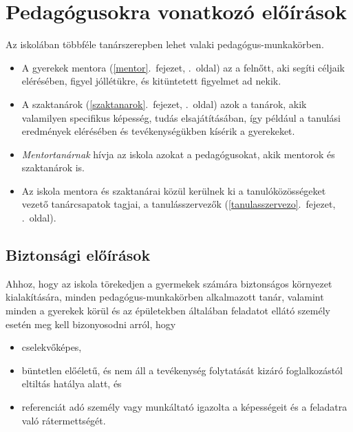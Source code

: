\hypertarget{pedagogusokra-vonatkozo-eloirasok}{%
\section{Pedagógusokra vonatkozó
előírások}\label{pedagogusokra-vonatkozo-eloirasok}}

Az iskolában többféle tanárszerepben lehet valaki pedagógus-mun\-ka\-kör\-ben.

\begin{itemize}
\item
  A gyerekek mentora (\ref{mentor}.~fejezet, \pageref{mentor}.~oldal)
  az a felnőtt, aki segíti céljaik elérésében, figyel jóllétükre, és
  kitüntetett figyelmet ad nekik.
\item
  A
  szaktanárok (\ref{szaktanarok}.~fejezet, \pageref{szaktanarok}.~oldal)
  azok a tanárok, akik valamilyen specifikus képesség, tudás elsajátításában, így például a tanulási
  eredmények elérésében
  és tevékenységükben kísérik a gyerekeket.
\item
  \emph{Mentortanárnak} hívja az iskola azokat a pedagógusokat, akik
  mentorok és szaktanárok is.
\item
  Az iskola mentora és szaktanárai közül kerülnek ki a
  tanulóközösségeket vezető tanárcsapatok tagjai, a
  tanulásszervezők (\ref{tanulasszervezo}.~fejezet, \pageref{tanulasszervezo}.~oldal).
\end{itemize}

\hypertarget{biztonsagi-eloirasok}{%
\subsection{Biztonsági előírások}\label{biztonsagi-eloirasok}}

Ahhoz, hogy az iskola törekedjen a gyermekek számára biztonságos
környezet kialakítására, minden pedagógus-munkakörben alkalmazott tanár,
valamint minden a gyerekek körül és az épületekben általában feladatot
ellátó személy esetén meg kell bizonyosodni arról, hogy

\begin{itemize}
\tightlist
\item
  cselekvőképes,
\item
  büntetlen előéletű, és nem áll a tevékenység folytatását kizáró
  foglalkozástól eltiltás hatálya alatt, és
\item
  referenciát adó személy vagy munkáltató igazolta a
  képességeit és a feladatra való rátermettségét.
\end{itemize}

